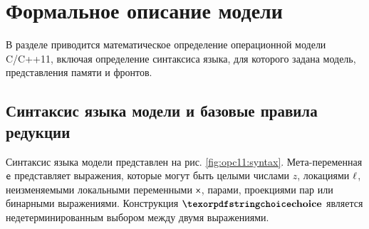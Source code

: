 

\section{Формальное описание модели}
\label{sec:opc11:formal}
В разделе приводится математическое определение операционной модели C/C++11,
включая определение синтаксиса языка, для которого задана модель,
представления памяти и фронтов.

\subsection{Синтаксис языка модели и базовые правила редукции}
\label{sec:opc11:formal:baselang}
Синтаксис языка модели представлен на рис. \ref{fig:opc11:syntax}.
Мета-переменная $\mathsf{e}$ представляет выражения, которые могут быть
целыми числами $z$, локациями $\ell$, неизменяемыми локальными
переменными $\mathsf{x}$, парами, проекциями пар или бинарными выражениями.
Конструкция $\kw{choice}$ является недетерминированным выбором между двумя
выражениями.

